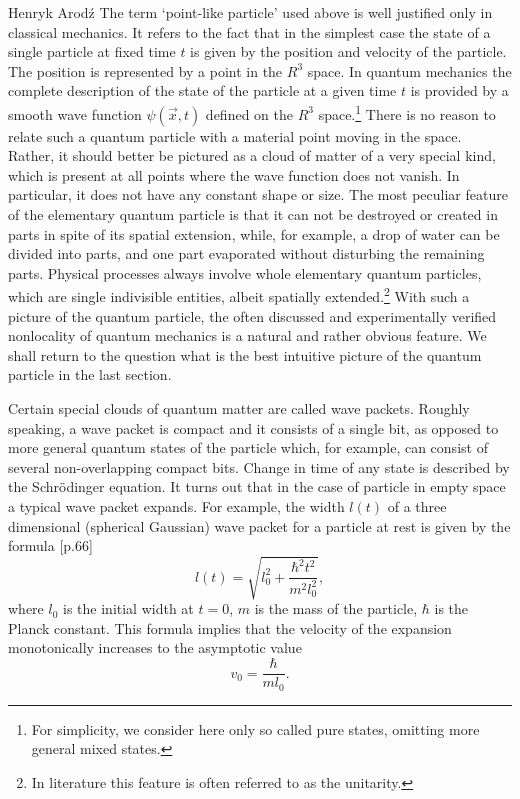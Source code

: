 \begin{artengenv}{Henryk Arod\'z}
The term `point-like particle' used above is well justified only in classical mechanics. It refers to the fact that in the simplest case the state of a single particle at fixed time $t$ is given by the position and velocity of the particle. The position is represented by a point in the $R^3$ space. In quantum mechanics the complete description of the state of the particle at a given time $t$ is provided by a smooth wave function $\psi(\vec{x}, t)$ defined on the $R^3$ space.\footnote{For simplicity, we consider here only so called pure states, omitting more general mixed states.} 
There is no reason to relate such a quantum particle with a material point moving in the space. Rather, it should better be pictured as a cloud of matter of a very special kind, which is present at all points where the wave function does not vanish. In particular, it does not have any constant shape or size. The most peculiar feature of the elementary quantum particle is that it can not be destroyed or created in parts in spite of its spatial extension, while, for example, a drop of water can be divided into parts, and one part evaporated without disturbing the remaining parts. Physical processes always involve whole elementary quantum particles, which are single indivisible entities, albeit spatially extended.\footnote{In literature this feature is often referred to as the unitarity.} With such a picture of the quantum particle, the often discussed and experimentally verified nonlocality of quantum mechanics is a natural and rather obvious feature. We shall return to the question what is the best intuitive picture of the quantum particle in the last section. 

Certain special clouds of quantum matter are called wave packets. Roughly speaking, a wave packet is compact and it consists of a single bit, as opposed to more general quantum states of the particle which, for example, can consist of several non-overlapping compact bits. 
Change in time of any state is described by the Schr\"odinger equation.
It turns out that in the case of particle in empty space a typical wave packet expands. For example, the width $l(t)$ of a
 three dimensional (spherical Gaussian) wave packet for a particle at rest is given by the formula [p.66]\parencite{qmtext}
\[ l(t) = \sqrt{l^2_0 + \frac{\hbar^2 t^2}{ m^2 l_0^2}}, \]
where $l_0$ is the initial width at $t=0$, $m$ is the mass of the particle, $\hbar$ is the Planck constant. This formula implies that the velocity of the expansion monotonically increases to the asymptotic value
\[ v_0 = \frac{\hbar}{ m l_0}.\]


\end{artengenv}
